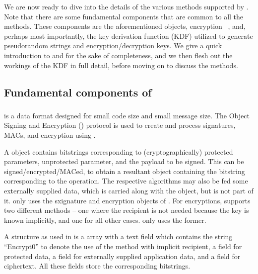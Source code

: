 We are now ready to dive into the details of the various methods supported by \mEdhoc. Note that there are some fundamental components that are common to all the \mEdhoc methods. These components are the aforementioned \mCose objects, \mAead encryption~\cite{aead} , and, perhaps most importantly, the key derivation function (KDF) utilized to generate pseudorandom strings and encryption/decryption keys. We give a quick introduction to \mCose and \mAead for the sake of completeness, and we then flesh out the workings of the KDF in full detail, before moving on to discuss the \mEdhoc methods.
 
\subsection{Fundamental components of \mEdhoc}
\subsubsection{\mCose}
\mCbor is a data format designed for small code size and small message size. The \mCbor Object Signing and Encryption (\mCose) protocol is used to create and process signatures, MACs, and encryption using \mCbor. 

A \mCose object contains bitstrings corresponding to (cryptographically) protected parameters, unprotected parameter, and the payload to be signed. This can be signed/encrypted/MACed, to obtain a resultant \mCose object containing the bitstring corresponding to the operation. The respective algorithms may also be fed some externally supplied data, which is carried along with the \mCose object, but is not part of it. \mEdhoc only uses the sxignature and encryption objects of \mCose. For encryptions, \mCose supports two different methods -- one where the recipient is not needed because the key is known implicitly, and one for all other cases. \mEdhoc only uses the former. 

A \mCoseEncrypt structure as used in \mEdhoc is a \mCbor array with a text field which contains the string ``Encrypt0'' to denote the use of the method with implicit recipient, a field for protected data, a field for externally supplied application data, and a field for ciphertext. All these fields store the corresponding bitstrings.

